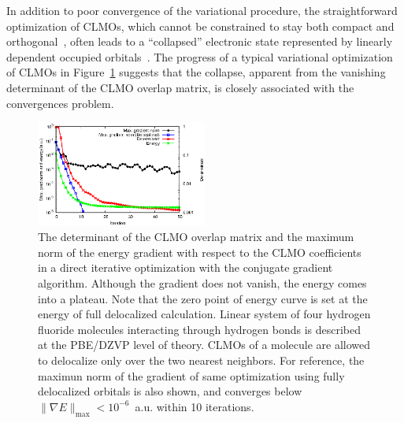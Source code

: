 \documentclass[aps,prl,twocolumn,reprint,amsmath,amssymb]{revtex4-1}
\begin{document}
%
In addition to poor convergence of the variational procedure, the straightforward optimization of CLMOs, which cannot be constrained to stay both compact and orthogonal~\cite{stoll1980use, RZZK}, often leads to a ``collapsed'' electronic state represented by linearly dependent occupied orbitals~\cite{ordejon1995linear}. 
%
The progress of a typical variational optimization of CLMOs in Figure~\ref{fig:det} suggests that the collapse, apparent from the vanishing determinant of the CLMO overlap matrix, is closely associated with the convergences problem.


\begin{figure}
\includegraphics[width=0.5\textwidth]{det}
\caption{
The determinant of the CLMO overlap matrix and the maximum norm of the energy gradient with respect to the CLMO coefficients in a direct iterative optimization with the conjugate gradient algorithm. Although the gradient does not vanish, the energy comes into a plateau. Note that the zero point of energy curve is set at the energy of full delocalized calculation. Linear system of four hydrogen fluoride molecules interacting through hydrogen bonds is described at the PBE/DZVP level of theory. CLMOs of a molecule are allowed to delocalize only over the two nearest neighbors. For reference, the maximun norm of the gradient of same optimization using fully delocalized orbitals is also shown, and converges below $\| \nabla E \|_{\text{max}} < 10^{-6}$~a.u. within 10 iterations.\emph{}}
\label{fig:det}
\end{figure}
\end{document}

